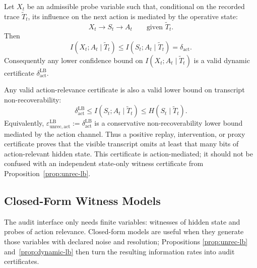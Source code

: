   \begin{proposition}
  \label{prop:dynamic-lb}
  Let $X_t$ be an admissible probe variable such that, conditional on the
  recorded trace $\tilde T_t$, its influence on the next action is mediated by
  the operative state:
  \[
    X_t \longrightarrow S_t \longrightarrow A_t
    \qquad\text{given }\tilde T_t .
  \]
  Then
  \[
    I(X_t;A_t\mid \tilde T_t)
    \leq
    I(S_t;A_t\mid \tilde T_t)
    =\delta_\text{act}.
  \]
  Consequently any lower confidence bound on
  $I(X_t;A_t\mid\tilde T_t)$ is a valid dynamic certificate
  $\delta_\text{act}^\text{LB}$.
  \end{proposition}

  \begin{corollary}
  \label{cor:action-mediated-unrec}
  Any valid action-relevance certificate is also a valid lower bound on
  transcript non-recoverability:
  \[
    \delta_\text{act}^\text{LB}
    \leq
    I(S_t;A_t\mid\tilde T_t)
    \leq
    H(S_t\mid\tilde T_t).
  \]
  Equivalently,
  $\varepsilon_{\mathrm{unrec,act}}^\mathrm{LB}:=
  \delta_\text{act}^\text{LB}$ is a conservative non-recoverability lower
  bound mediated by the action channel.
  Thus a positive replay, intervention, or proxy certificate proves that the
  visible transcript omits at least that many bits of action-relevant hidden
  state. This certificate is action-mediated; it should not be confused with an
  independent state-only witness certificate from Proposition~\ref{prop:unrec-lb}.
  \end{corollary}

  \subsection{Closed-Form Witness Models}
  \label{sec:engine}

  The audit interface only needs finite variables: witnesses of hidden state and
  probes of action relevance. Closed-form models are useful when they generate
  those variables with declared noise and resolution; Propositions
  \ref{prop:unrec-lb} and~\ref{prop:dynamic-lb} then turn the resulting
  information rates into audit certificates.

